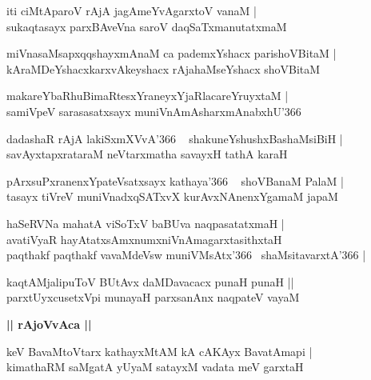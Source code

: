 \documentclass[twoside,12pt,openright]{book}
\newcounter{shloka}[chapter]
\def\uvaca#1{\centerline{{\large\textbf{#1}}}}
\begin{document}
\begin{shloka}%
iti ciMtAparoV rAjA jagAmeYvAgarxtoV vanaM |\\
sukaqtasayx parxBAveVna saroV daqSaTxmanutatxmaM 
\end{shloka}

\begin{shloka}%
miVnasaMsapxqqshayxmAnaM ca pademxYshacx parishoVBitaM |\\
kAraMDeYshacxkarxvAkeyshacx rAjahaMseYshacx shoVBitaM
\end{shloka}

\begin{shloka}%
makareYbaRhuBimaRtesxYraneyxYjaRlacareYruyxtaM |\\
samiVpeV sarasasatxsayx muniVnAmAsharxmAnabxhU\char'366 
\end{shloka}

\begin{shloka}%
dadashaR rAjA lakiSxmXVvA\char'366 ~ shakuneYshushxBashaMsiBiH |\\
savAyxtapxrataraM neVtarxmatha savayxH tathA karaH 
\end{shloka}

\begin{shloka}%
pArxsuPxranenxYpateVsatxsayx kathaya\char'366 ~ shoVBanaM PalaM |\\
tasayx tiVreV muniVnadxqSATxvX kurAvxNAnenxYgamaM japaM 
\end{shloka}

\begin{shloka}%
haSeRVNa mahatA viSoTxV baBUva naqpasatatxmaH |\\
avatiVyaR hayAtatxsAmxnumxniVnAmagarxtasithxtaH \\
paqthakf paqthakf vavaMdeVsw muniVMsAtx\char'366 ~shaMsitavarxtA\char'366 |\\
\end{shloka}

\begin{shloka}%
kaqtAMjalipuToV BUtAvx daMDavacacx punaH punaH ||\\
parxtUyxcusetxVpi munayaH parxsanAnx naqpateV vayaM 
\end{shloka}

\uvaca{|| rAjoVvAca ||}

\begin{shloka}%
keV BavaMtoVtarx kathayxMtAM kA cAKAyx BavatAmapi |\\
kimathaRM saMgatA yUyaM satayxM vadata meV garxtaH 
\end{shloka}
\end{document}
